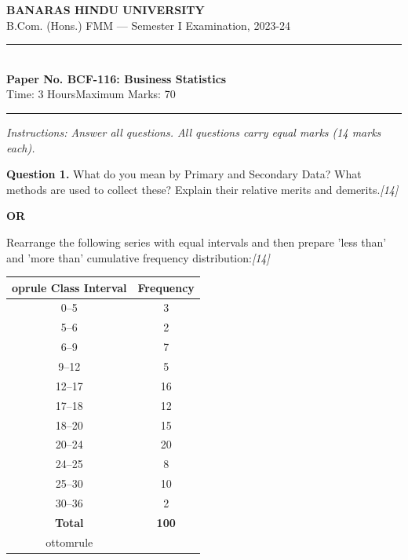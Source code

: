 \documentclass[11pt,a4paper]{article}
\newcommand{\pts}[1]{\hfill   \textit{[#1]}}
\begin{document}
\begin{center}
  {\large\bfseries BANARAS HINDU UNIVERSITY}\\[2pt]
  {\normalsize B.Com. (Hons.) FMM --- Semester I Examination, 2023-24}\\[6pt]
  \rule{0.8\linewidth}{0.5pt}\\[6pt]
  {\large\bfseries Paper No. BCF-116: Business Statistics}\\[4pt]
  {\normalsize Time: 3 Hours\hfill Maximum Marks: 70}
\end{center}

\rule{\linewidth}{0.4pt}

\smallskip



\noindent   \textit{Instructions: Answer all questions. All questions carry equal marks (14 marks each).}

\bigskip




\noindent   \textbf{Question 1.}
What do you mean by Primary and Secondary Data? What methods are used to collect these? Explain their relative merits and demerits.\pts{14}

\centerline{   \textbf{OR}}

Rearrange the following series with equal intervals and then prepare 'less than' and 'more than' cumulative frequency distribution:\pts{14}

\begin{center}
  \small
  
\begin{tabular}{cc}
     oprule
   \textbf{Class Interval} &   \textbf{Frequency} \\
    \midrule
    0--5   & 3   \\
    5--6   & 2   \\
    6--9   & 7   \\
    9--12  & 5   \\
    12--17 & 16  \\
    17--18 & 12  \\
    18--20 & 15  \\
    20--24 & 20  \\
    24--25 & 8   \\
    25--30 & 10  \\
    30--36 & 2   \\
    \midrule
   \textbf{Total} &   \textbf{100} \\
    ottomrule
  \end{tabular}
\end{center}
\end{document}

